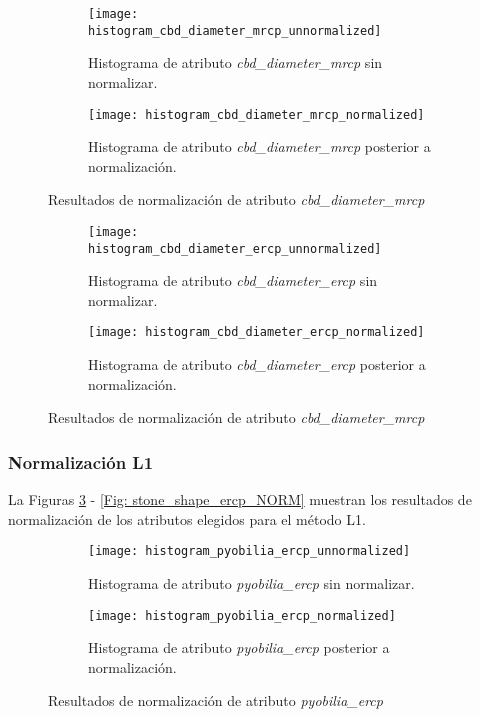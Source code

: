 \begin{figure}[!htb]
	\centering
	\begin{subfigure}[b]{0.4\textwidth}
		\centering
		\texttt{[image: histogram\_cbd\_diameter\_mrcp\_unnormalized]}
		\caption{Histograma de atributo \emph{cbd\_diameter\_mrcp} sin normalizar.}
	\end{subfigure}
	\hfill
	\begin{subfigure}[b]{0.4\textwidth}
		\centering
		\texttt{[image: histogram\_cbd\_diameter\_mrcp\_normalized]}
		\caption{Histograma de atributo \emph{cbd\_diameter\_mrcp} posterior a normalización.}
	\end{subfigure}
	\caption{Resultados de normalización de atributo \emph{cbd\_diameter\_mrcp}}
	\label{Fig: cbd_diameter_mrcp_NORM}
\end{figure}


\begin{figure}[!htb]
	\centering
	\begin{subfigure}[b]{0.4\textwidth}
		\centering
		\texttt{[image: histogram\_cbd\_diameter\_ercp\_unnormalized]}
		\caption{Histograma de atributo \emph{cbd\_diameter\_ercp} sin normalizar.}
	\end{subfigure}
	\hfill
	\begin{subfigure}[b]{0.4\textwidth}
		\centering
		\texttt{[image: histogram\_cbd\_diameter\_ercp\_normalized]}
		\caption{Histograma de atributo \emph{cbd\_diameter\_ercp} posterior a normalización.}
	\end{subfigure}
	\caption{Resultados de normalización de atributo \emph{cbd\_diameter\_mrcp}}
	\label{Fig: cbd_diameter_ercp_NORM}
\end{figure}


\FloatBarrier
\subsubsection{Normalización L1}
La Figuras \ref{Fig: pyobilia_ercp_NORM} - \ref{Fig: stone_shape_ercp_NORM} muestran los resultados de normalización de los atributos elegidos para el método L1.

\begin{figure}[!htb]
	\centering
	\begin{subfigure}[b]{0.4\textwidth}
		\centering
		\texttt{[image: histogram\_pyobilia\_ercp\_unnormalized]}
		\caption{Histograma de atributo \emph{pyobilia\_ercp} sin normalizar.}
	\end{subfigure}
	\hfill
	\begin{subfigure}[b]{0.4\textwidth}
		\centering
		\texttt{[image: histogram\_pyobilia\_ercp\_normalized]}
		\caption{Histograma de atributo \emph{pyobilia\_ercp} posterior a normalización.}
	\end{subfigure}
	\caption{Resultados de normalización de atributo \emph{pyobilia\_ercp}}
	\label{Fig: pyobilia_ercp_NORM}
\end{figure}


